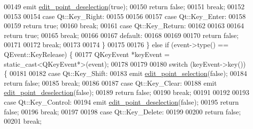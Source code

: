 \begin{DoxyCode}
00149                     emit \hyperlink{a00008_a2b9629d20c2b97c01bf8486c89fd0148}{edit\_point\_deselection}(\textcolor{keyword}{true});
00150                     \textcolor{keywordflow}{return} \textcolor{keyword}{false};
00151                  \textcolor{keywordflow}{break};
00152 
00153 
00154             \textcolor{keywordflow}{case} Qt::Key\_Right:
00155 
00156 
00157             \textcolor{keywordflow}{case} Qt::Key\_Enter:
00158 
00159                  \textcolor{keywordflow}{return} \textcolor{keyword}{true};
00160                 \textcolor{keywordflow}{break};
00161             \textcolor{keywordflow}{case} Qt::Key\_Return:
00162 
00163 
00164                  \textcolor{keywordflow}{return} \textcolor{keyword}{true};
00165                 \textcolor{keywordflow}{break};
00166 
00167             \textcolor{keywordflow}{default}:
00168 
00169 
00170                 \textcolor{keywordflow}{return} \textcolor{keyword}{false};
00171 
00172                \textcolor{keywordflow}{break};
00173 
00174             \}
00175 
00176         \} \textcolor{keywordflow}{else}  \textcolor{keywordflow}{if} (event->type() == QEvent::KeyRelease) \{
00177             QKeyEvent *keyEvent = \textcolor{keyword}{static\_cast<}QKeyEvent*\textcolor{keyword}{>}(event);
00178 
00179 
00180             \textcolor{keywordflow}{switch} (keyEvent->key()) \{
00181 
00182             \textcolor{keywordflow}{case} Qt::Key\_Shift:
00183                    emit \hyperlink{a00008_a9aa2af0c329358fd96f7fb6b7f02bfe1}{edit\_point\_selection}(\textcolor{keyword}{false});
00184                   \textcolor{keywordflow}{return} \textcolor{keyword}{false};
00185                  \textcolor{keywordflow}{break};
00186 
00187             \textcolor{keywordflow}{case} Qt::Key\_Clear:
00188                     emit \hyperlink{a00008_a2b9629d20c2b97c01bf8486c89fd0148}{edit\_point\_deselection}(\textcolor{keyword}{false});
00189                     \textcolor{keywordflow}{return} \textcolor{keyword}{false};
00190                      \textcolor{keywordflow}{break};
00191 
00192 
00193             \textcolor{keywordflow}{case} Qt::Key\_Control:
00194                     emit \hyperlink{a00008_a2b9629d20c2b97c01bf8486c89fd0148}{edit\_point\_deselection}(\textcolor{keyword}{false});
00195                     \textcolor{keywordflow}{return} \textcolor{keyword}{false};
00196                      \textcolor{keywordflow}{break};
00197 
00198             \textcolor{keywordflow}{case} Qt::Key\_Delete:
00199 
00200                     \textcolor{keywordflow}{return} \textcolor{keyword}{false};
00201                      \textcolor{keywordflow}{break};

\end{DoxyCode}
